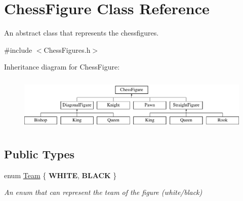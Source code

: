 \hypertarget{classChessFigure}{}\section{Chess\+Figure Class Reference}
\label{classChessFigure}


An abstract class that represents the chessfigures.  




{\ttfamily \#include $<$Chess\+Figures.\+h$>$}

Inheritance diagram for Chess\+Figure\+:\begin{figure}[H]
\begin{center}
\leavevmode
\includegraphics[height=2.616822cm]{classChessFigure}
\end{center}
\end{figure}
\subsection*{Public Types}
\begin{DoxyCompactItemize}
\item 
\mbox{\label{classChessFigure_a62f54318c1f28a08e6a6a2707f697a1d}} 
enum \mbox{\hyperlink{classChessFigure_a62f54318c1f28a08e6a6a2707f697a1d}{Team}} \{ {\bfseries W\+H\+I\+TE}, 
{\bfseries B\+L\+A\+CK}
 \}
\begin{DoxyCompactList}\small\item\em An enum that can represent the team of the figure (white/black) \end{DoxyCompactList}\end{DoxyCompactItemize}
